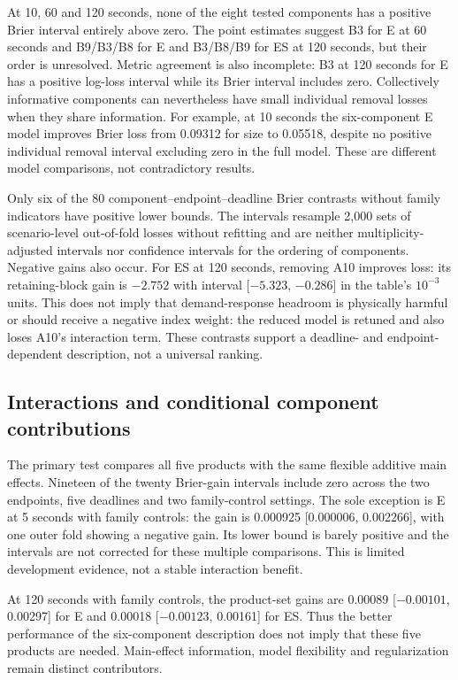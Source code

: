 At 10, 60 and 120 seconds, none of the eight tested components has a
positive Brier interval entirely above zero. The point estimates suggest
B3 for E at 60 seconds and B9/B3/B8 for E and B3/B8/B9 for ES at
120 seconds, but their order is unresolved. Metric agreement is also
incomplete: B3 at 120 seconds for E has a positive log-loss interval
while its Brier interval includes zero. Collectively informative
components can nevertheless have small individual removal losses when
they share information. For example, at 10 seconds the six-component
E model improves Brier loss from 0.09312 for size to 0.05518, despite
no positive individual removal interval excluding zero in the full model.
These are different model comparisons, not contradictory results.

Only six of the 80 component--endpoint--deadline Brier contrasts without
family indicators have positive lower bounds. The intervals resample
2,000 sets of scenario-level out-of-fold losses without refitting and
are neither multiplicity-adjusted intervals nor confidence intervals
for the ordering of components. Negative gains also occur. For ES at
120 seconds, removing A10 improves loss: its retaining-block gain is
$-2.752$ with interval [$-5.323$, $-0.286$] in the table's $10^{-3}$
units. This does not imply that demand-response headroom is physically
harmful or should receive a negative index weight: the reduced model is
retuned and also loses A10's interaction term. These contrasts support
a deadline- and endpoint-dependent description, not a universal ranking.

\subsection{Interactions and conditional component contributions}
The primary test compares all five products with the same flexible additive
main effects. Nineteen of the twenty Brier-gain intervals include zero
across the two endpoints, five deadlines and two family-control settings.
The sole exception is E at 5 seconds with family controls:
the gain is 0.000925 [0.000006, 0.002266], with one outer fold showing
a negative gain. Its lower bound is barely positive and the intervals
are not corrected for these multiple comparisons. This is limited
development evidence, not a stable interaction benefit.

At 120 seconds with family controls, the product-set gains are
0.00089 [$-0.00101$, 0.00297] for E and
0.00018 [$-0.00123$, 0.00161] for ES.
Thus the better performance of the six-component description does not
imply that these five products are needed. Main-effect information,
model flexibility and regularization remain distinct contributors.

